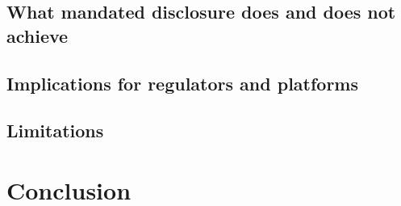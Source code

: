 \documentclass[acmsmall,review,anonymous]{acmart}
\begin{document}
\subsection{What mandated disclosure does and does not achieve}
\subsection{Implications for regulators and platforms}
\subsection{Limitations}

\section{Conclusion}

\begin{acks}
\end{acks}



\end{document}
